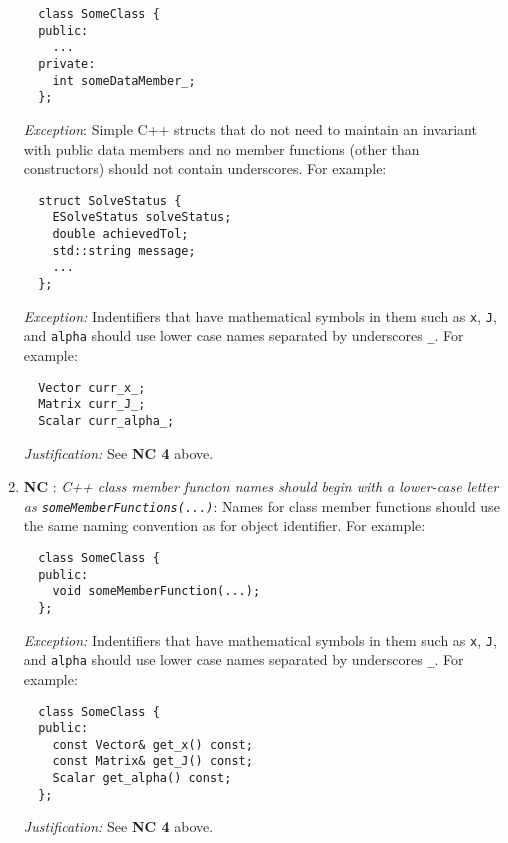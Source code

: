 \begin{enumerate}
{\small\begin{verbatim}
  class SomeClass {
  public:
    ...
  private:
    int someDataMember_;
  };
\end{verbatim}}

{}\textit{Exception}: Simple C++ structs that do not need to maintain an
invariant with public data members and no member functions (other than
constructors) should not contain underscores.  For example:

{\small\begin{verbatim}
  struct SolveStatus {
    ESolveStatus solveStatus;
    double achievedTol;
    std::string message;
    ...
  };
\end{verbatim}}

{}\textit{Exception:} Indentifiers that have mathematical symbols in them such
as {}\texttt{x}, {}\texttt{J}, and {}\texttt{alpha} should use lower case
names separated by underscores {}\texttt{\_}.  For example:

{\small\begin{verbatim}
  Vector curr_x_;
  Matrix curr_J_;
  Scalar curr_alpha_;
\end{verbatim}}

{}\textit{Justification:} See {}\textbf{NC 4} above.

{}\item{}\textbf{NC }:
{}\textit{C++ class member functon names should begin with a lower-case letter
as {}\texttt{someMemberFunctions(...)}}: Names for class member functions
should use the same naming convention as for object identifier.  For example:

{\small\begin{verbatim}
  class SomeClass {
  public:
    void someMemberFunction(...);
  };
\end{verbatim}}

{}\textit{Exception:} Indentifiers that have mathematical symbols in them such
as {}\texttt{x}, {}\texttt{J}, and {}\texttt{alpha} should use lower case
names separated by underscores {}\texttt{\_}.  For example:

{\small\begin{verbatim}
  class SomeClass {
  public:
    const Vector& get_x() const;
    const Matrix& get_J() const;
    Scalar get_alpha() const;
  };
\end{verbatim}}

{}\textit{Justification:} See {}\textbf{NC 4} above.


\end{enumerate}

